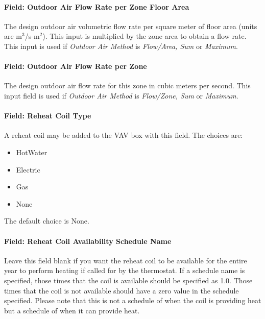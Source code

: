 \paragraph{Field: Outdoor Air Flow Rate per Zone Floor Area}\label{field-outdoor-air-flow-rate-per-zone-floor-area-8}

The design outdoor air volumetric flow rate per square meter of floor area (units are m\(^{3}\)/s-m\(^{2}\)). This input is multiplied by the zone area to obtain a flow rate. This input is used if \emph{Outdoor Air Method} is \emph{Flow/Area, Sum} or \emph{Maximum}.

\paragraph{Field: Outdoor Air Flow Rate per Zone}\label{field-outdoor-air-flow-rate-per-zone-8}

The design outdoor air flow rate for this zone in cubic meters per second. This input field is used if \emph{Outdoor Air Method} is \emph{Flow/Zone, Sum} or \emph{Maximum}.

\paragraph{Field: Reheat Coil Type}\label{field-reheat-coil-type}

A reheat coil may be added to the VAV box with this field. The choices are:

\begin{itemize}
\item
  HotWater
\item
  Electric
\item
  Gas
\item
  None
\end{itemize}

The default choice is None.

\paragraph{Field: Reheat Coil Availability Schedule Name}\label{field-reheat-coil-availability-schedule-name}

Leave this field blank if you want the reheat coil to be available for the entire year to perform heating if called for by the thermostat. If a schedule name is specified, those times that the coil is available should be specified as 1.0. Those times that the coil is not available should have a zero value in the schedule specified. Please note that this is not a schedule of when the coil is providing heat but a schedule of when it can provide heat.

